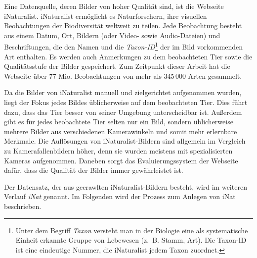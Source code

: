 Eine Datenquelle, deren Bilder von hoher Qualität sind, ist die Webseite iNaturalist. iNaturalist ermöglicht es Naturforschern, ihre visuellen Beobachtungen der Biodiversität weltweit zu teilen. Jede Beobachtung besteht aus einem Datum, Ort, Bildern (oder Video- sowie Audio-Dateien) und Beschriftungen, die den Namen und die \emph{Taxon-ID}\footnote{Unter dem Begriff \emph{Taxon} versteht man in der Biologie eine als systematische Einheit erkannte Gruppe von Lebewesen (z.~B. Stamm, Art). Die Taxon-ID ist eine eindeutige Nummer, die iNaturalist jedem Taxon zuordnet.} der im Bild vorkommenden Art enthalten. Es werden auch Anmerkungen zu dem beobachteten Tier sowie die Qualitätsstufe der Bilder gespeichert. Zum Zeitpunkt dieser Arbeit hat die Webseite über 77 Mio. Beobachtungen von mehr als 345\,000 Arten gesammelt.

Da die Bilder von iNaturalist manuell und zielgerichtet aufgenommen wurden, liegt der Fokus jedes Bildes üblicherweise auf dem beobachteten Tier. Dies führt dazu, dass das Tier besser von seiner Umgebung unterscheidbar ist. Außerdem gibt es für jedes beobachtete Tier selten nur ein Bild, sondern üblicherweise mehrere Bilder aus verschiedenen Kamerawinkeln und somit mehr erlernbare Merkmale. Die Auflösungen von iNaturalist-Bildern sind allgemein im Vergleich zu Kamerafallenbildern höher, denn sie wurden meistens mit spezialisierten Kameras aufgenommen. Daneben sorgt das Evaluierungssystem der Webseite dafür, dass die Qualität der Bilder immer gewährleistet ist.

Der Datensatz, der aus gecrawlten iNaturalist-Bildern besteht, wird im weiteren Verlauf \emph{iNat} genannt. Im Folgenden wird der Prozess zum Anlegen von iNat beschrieben.

